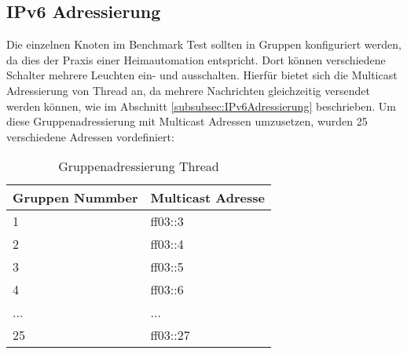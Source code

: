 \subsection{IPv6 Adressierung}\label{subsec:IPv6Adressierung}
Die einzelnen Knoten im Benchmark Test sollten in Gruppen konfiguriert werden, da dies der Praxis einer Heimautomation entspricht. Dort können verschiedene Schalter mehrere Leuchten ein- und ausschalten. Hierfür bietet sich die Multicast Adressierung von Thread an, da mehrere Nachrichten gleichzeitig versendet werden können, wie im Abschnitt \ref{subsubsec:IPv6Adressierung} beschrieben. Um diese Gruppenadressierung mit Multicast Adressen umzusetzen, wurden 25 verschiedene Adressen vordefiniert:

\begin{table}[H]
	\centering
	\begin{tabular}{|l|l|}
		\hline
		\textbf{Gruppen Nummber} & \textbf{Multicast Adresse} \\ \hline
		1                        & ff03::3                    \\ \hline
		2                        & ff03::4                    \\ \hline
		3                        & ff03::5                    \\ \hline
		4                        & ff03::6                    \\ \hline
		...                      & ...                        \\ \hline
		25                       & ff03::27                   \\ \hline
	\end{tabular}
	\caption{Gruppenadressierung Thread}
	\label{table:GruppenadressierungThread}
\end{table}